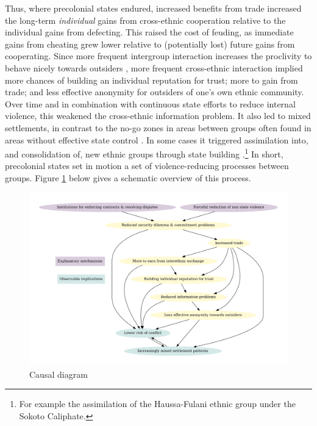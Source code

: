 Thus, where precolonial states endured, increased benefits from trade increased
the long-term \textit{individual} gains from cross-ethnic cooperation relative
to the individual gains from defecting. This raised the cost of feuding, as
immediate gains from cheating grew lower relative to (potentially lost) future
gains from cooperating. Since more frequent intergroup interaction increases the
proclivity to behave nicely towards outsiders \citep[721]{Fearon_1996}, more
frequent cross-ethnic interaction implied more chances of building an individual
reputation for trust; more to gain from trade; and less effective anonymity for
outsiders of one’s own ethnic community. Over time and in combination with
continuous state efforts to reduce internal violence, this weakened the
cross-ethnic information problem. It also led to mixed settlements, in contrast
to the no-go zones in areas between groups often found in areas without
effective state control \citep{diamond2013world,McCabe 1994}. In some cases it
triggered assimilation into, and consolidation of, new ethnic groups through
state building \citep{Anderson2006}.\footnote{For example the assimilation of
the Haussa-Fulani ethnic group under the Sokoto Caliphate.} In short,
precolonial states set in motion a set of violence-reducing processes between
groups. Figure \ref{causal} below gives a schematic overview of this process.

\begin{figure}[hbtp]
	\centering
	\includegraphics[width=1\linewidth]{img/OMTcausal.pdf}
	\caption{Causal diagram}
	\label{causal}
\end{figure}

